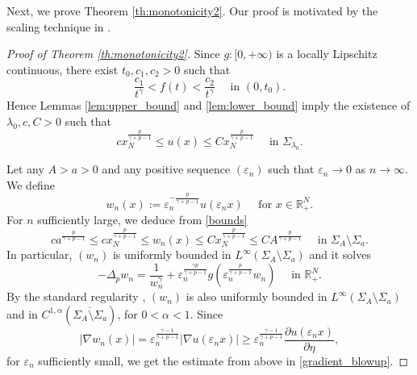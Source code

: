 \documentclass[reqno]{amsart}
\theoremstyle{plain}
\theoremstyle{definition}
\theoremstyle{remark}
\begin{document}
	Next, we prove Theorem \ref{th:monotonicity2}. Our proof is motivated by the scaling technique in \cite{MR3459013}.
	\begin{proof}[Proof of Theorem \ref{th:monotonicity2}]
		Since $g:[0,+\infty)$ is a locally Lipschitz continuous, there exist $t_0,c_1,c_2>0$ such that
		\[
		\frac{c_1}{t^\gamma}<f(t)<\frac{c_2}{t^\gamma}\quad\text{ in } (0,t_0).
		\]
		Hence Lemmas \ref{lem:upper_bound} and \ref{lem:lower_bound} imply the existence of $\lambda_0,c,C>0$ such that
		\begin{equation}\label{bounds}
			c x_N^\frac{p}{\gamma+p-1} \le u(x) \le C x_N^\frac{p}{\gamma+p-1} \quad\text{ in } \Sigma_{\lambda_0}.
		\end{equation} 
		
		Let any $A>a>0$ and any positive sequence $(\varepsilon_n)$ such that $\varepsilon_n\to0$ as $n\to\infty$. We define
		\[
		w_n(x) := \varepsilon_n^{-\frac{p}{\gamma+p-1}} u(\varepsilon_n x) \quad\text{ for } x \in \mathbb{R}^N_+.
		\]
		For $n$ sufficiently large, we deduce from \eqref{bounds}
		\begin{equation}\label{wn_bound}
			c a^\frac{p}{\gamma+p-1} \le c x_N^\frac{p}{\gamma+p-1} \le w_n(x) \le C x_N^\frac{p}{\gamma+p-1} \le C A^\frac{p}{\gamma+p-1} \quad\text{ in } \Sigma_A\setminus \Sigma_a.
		\end{equation}
		In particular, $(w_n)$ is uniformly bounded in $L^\infty(\Sigma_A\setminus \Sigma_a)$ and it solves
		\begin{equation}\label{wn}
			-\Delta_p w_n = \frac{1}{w_n^\gamma} + \varepsilon_n^\frac{\gamma p}{\gamma+p-1} g(\varepsilon_n^\frac{p}{\gamma+p-1} w_n) \quad \text{ in } \mathbb{R}^N_+.
		\end{equation}
		By the standard regularity \cite{MR1814364}, $(w_n)$ is also uniformly bounded in $L^\infty(\Sigma_A\setminus \Sigma_a)$ and in $C^{1,\alpha}(\overline{\Sigma_A\setminus \Sigma_a})$, for $0 < \alpha < 1$. Since
		\[
		|\nabla w_n(x)| = \varepsilon_n^{\frac{\gamma-1}{\gamma+p-1}} |\nabla u(\varepsilon_n x)| \ge \varepsilon_n^{\frac{\gamma-1}{\gamma+p-1}} \frac{\partial u(\varepsilon_n x)}{\partial \eta},
		\]
		for $\varepsilon_n$ sufficiently small, we get the
		estimate from above in \eqref{gradient_blowup}.
		

\end{proof}
\end{document}
